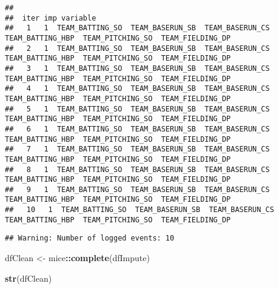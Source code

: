 \documentclass[
]{article}
\newenvironment{Shaded}{\begin{snugshade}}{\end{snugshade}}
\newcommand{\CommentTok}[1]{\textcolor[rgb]{0.56,0.35,0.01}{\textit{#1}}}
\newcommand{\DataTypeTok}[1]{\textcolor[rgb]{0.13,0.29,0.53}{#1}}
\newcommand{\DecValTok}[1]{\textcolor[rgb]{0.00,0.00,0.81}{#1}}
\newcommand{\KeywordTok}[1]{\textcolor[rgb]{0.13,0.29,0.53}{\textbf{#1}}}
\newcommand{\NormalTok}[1]{#1}
\newcommand{\OperatorTok}[1]{\textcolor[rgb]{0.81,0.36,0.00}{\textbf{#1}}}
\newcommand{\StringTok}[1]{\textcolor[rgb]{0.31,0.60,0.02}{#1}}
\begin{document}
\begin{Shaded}
\end{Shaded}

\begin{verbatim}
## 
##  iter imp variable
##   1   1  TEAM_BATTING_SO  TEAM_BASERUN_SB  TEAM_BASERUN_CS  TEAM_BATTING_HBP  TEAM_PITCHING_SO  TEAM_FIELDING_DP
##   2   1  TEAM_BATTING_SO  TEAM_BASERUN_SB  TEAM_BASERUN_CS  TEAM_BATTING_HBP  TEAM_PITCHING_SO  TEAM_FIELDING_DP
##   3   1  TEAM_BATTING_SO  TEAM_BASERUN_SB  TEAM_BASERUN_CS  TEAM_BATTING_HBP  TEAM_PITCHING_SO  TEAM_FIELDING_DP
##   4   1  TEAM_BATTING_SO  TEAM_BASERUN_SB  TEAM_BASERUN_CS  TEAM_BATTING_HBP  TEAM_PITCHING_SO  TEAM_FIELDING_DP
##   5   1  TEAM_BATTING_SO  TEAM_BASERUN_SB  TEAM_BASERUN_CS  TEAM_BATTING_HBP  TEAM_PITCHING_SO  TEAM_FIELDING_DP
##   6   1  TEAM_BATTING_SO  TEAM_BASERUN_SB  TEAM_BASERUN_CS  TEAM_BATTING_HBP  TEAM_PITCHING_SO  TEAM_FIELDING_DP
##   7   1  TEAM_BATTING_SO  TEAM_BASERUN_SB  TEAM_BASERUN_CS  TEAM_BATTING_HBP  TEAM_PITCHING_SO  TEAM_FIELDING_DP
##   8   1  TEAM_BATTING_SO  TEAM_BASERUN_SB  TEAM_BASERUN_CS  TEAM_BATTING_HBP  TEAM_PITCHING_SO  TEAM_FIELDING_DP
##   9   1  TEAM_BATTING_SO  TEAM_BASERUN_SB  TEAM_BASERUN_CS  TEAM_BATTING_HBP  TEAM_PITCHING_SO  TEAM_FIELDING_DP
##   10   1  TEAM_BATTING_SO  TEAM_BASERUN_SB  TEAM_BASERUN_CS  TEAM_BATTING_HBP  TEAM_PITCHING_SO  TEAM_FIELDING_DP
\end{verbatim}

\begin{verbatim}
## Warning: Number of logged events: 10
\end{verbatim}

\begin{Shaded}
\begin{Highlighting}[]
\NormalTok{dfClean <-}\StringTok{ }\NormalTok{mice}\OperatorTok{::}\KeywordTok{complete}\NormalTok{(dfImpute)}

\KeywordTok{str}\NormalTok{(dfClean)}
\end{Highlighting}
\end{Shaded}
\end{document}

